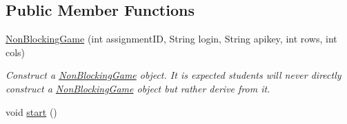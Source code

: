 \subsection*{Public Member Functions}
\begin{DoxyCompactItemize}
\item 
\hyperlink{classbridges_1_1games_1_1_non_blocking_game_a49b9b0ec57b9ab0fe099922bde75ed8a}{Non\+Blocking\+Game} (int assignment\+ID, String login, String apikey, int rows, int cols)
\begin{DoxyCompactList}\small\item\em Construct a \hyperlink{classbridges_1_1games_1_1_non_blocking_game}{Non\+Blocking\+Game} object. It is expected students will never directly construct a \hyperlink{classbridges_1_1games_1_1_non_blocking_game}{Non\+Blocking\+Game} object but rather derive from it. \end{DoxyCompactList}\item 
void \hyperlink{classbridges_1_1games_1_1_non_blocking_game_ac4df60691641278f139d138c7347674a}{start} ()
\end{DoxyCompactItemize}

